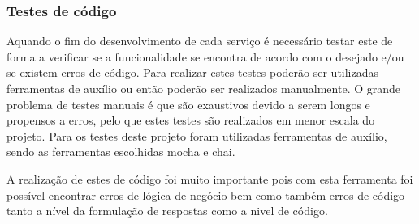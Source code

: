\subsubsection{Testes de código}
Aquando o fim do desenvolvimento de cada serviço é necessário testar este de forma a verificar se a funcionalidade se encontra de acordo com o desejado e/ou se existem erros de código. Para realizar estes testes poderão ser utilizadas ferramentas de auxílio ou então poderão ser realizados manualmente. O grande problema de testes manuais é que são exaustivos devido a serem longos e propensos a erros, pelo que estes testes são realizados em menor escala do projeto. Para os testes deste projeto foram utilizadas ferramentas de auxílio, sendo as ferramentas escolhidas mocha e chai.



A realização de estes de código foi muito importante pois com esta ferramenta foi possível encontrar erros de lógica de negócio bem como também erros de código tanto a nível da formulação de respostas como a nivel de código.



